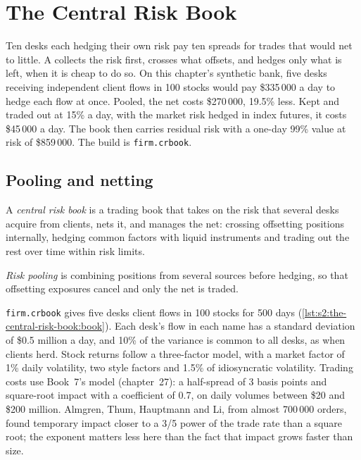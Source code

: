 \chapter{The Central Risk Book}\label{ch:s2:the-central-risk-book}

Ten desks each hedging their own risk pay ten spreads for trades that would net to little. A  collects the risk first, crosses what
offsets, and hedges only what is left, when it is cheap to do so. On this chapter's synthetic bank, five desks receiving independent client flows in
100 stocks would pay \$335\,000 a day to hedge each flow at once. Pooled, the net costs \$270\,000, 19.5\% less. Kept and traded out at 15\% a day, with
the market risk hedged in index futures, it costs \$45\,000 a day. The book then carries residual risk with a one-day 99\% value at risk of \$859\,000.
The build is \texttt{firm.crbook}.

\section{Pooling and netting}

\begin{definition}\label{def:s2:the-central-risk-book:crb}
A \emph{central risk book} is a trading book that takes on the risk that several desks acquire from clients, nets it, and
manages the net: crossing offsetting positions internally, hedging common factors with liquid instruments and trading out the rest over time within
risk limits.
\end{definition}

\begin{definition}\label{def:s2:the-central-risk-book:pooling}
\emph{Risk pooling} is combining positions from several sources before hedging, so that offsetting exposures cancel and only the
net is traded.
\end{definition}

\texttt{firm.crbook} gives five desks client flows in 100 stocks for 500 days (\cref{lst:s2:the-central-risk-book:book}). Each desk's flow in each name
has a standard deviation of \$0.5 million a day, and 10\% of the variance is common to all desks, as when clients herd. Stock returns follow a
three-factor model, with a market factor of 1\% daily volatility, two style factors and 1.5\% of idiosyncratic volatility. Trading costs use Book~7's
model (chapter~27): a half-spread of 3 basis points and square-root impact with a coefficient of 0.7, on daily volumes between \$20 and \$200 million.
Almgren, Thum, Hauptmann and Li, from almost 700\,000 orders, found temporary impact closer to a 3/5 power of the trade rate than a square root; the
exponent matters less here than the fact that impact grows faster than size.

